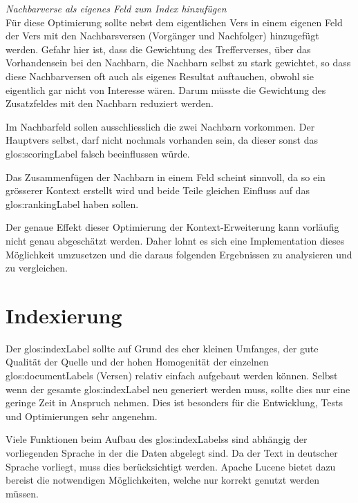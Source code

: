 \vspace{0.5em}
\textit{Nachbarverse als eigenes Feld zum Index hinzufügen}
\vspace{0.5em}\\
Für diese Optimierung sollte nebst dem eigentlichen Vers in einem eigenen Feld der Vers mit den Nachbarsversen (Vorgänger und Nachfolger) hinzugefügt werden.
Gefahr hier ist, dass die Gewichtung des Trefferverses, über das Vorhandensein bei den Nachbarn, die Nachbarn selbst zu stark gewichtet, so dass diese Nachbarversen oft auch als eigenes Resultat auftauchen, obwohl sie eigentlich gar nicht von Interesse wären. Darum müsste die Gewichtung des Zusatzfeldes mit den Nachbarn reduziert werden.

Im Nachbarfeld sollen ausschliesslich die zwei Nachbarn vorkommen. Der Hauptvers selbst, darf nicht nochmals vorhanden sein, da dieser sonst das \gls{glos:scoringLabel} falsch beeinflussen würde.

Das Zusammenfügen der Nachbarn in einem Feld scheint sinnvoll, da so ein grösserer Kontext erstellt wird und beide Teile gleichen Einfluss auf das \gls{glos:rankingLabel} haben sollen.

Der genaue Effekt dieser Optimierung der Kontext-Erweiterung kann vorläufig nicht genau abgeschätzt werden.
Daher lohnt es sich eine Implementation dieses Möglichkeit umzusetzen und die daraus folgenden Ergebnissen zu analysieren und zu vergleichen.


\section{Indexierung}
\label{sec:indexing}
Der \gls{glos:indexLabel} sollte auf Grund des eher kleinen Umfanges, der gute Qualität der Quelle und der hohen Homogenität der einzelnen \glspl{glos:documentLabel} (Versen) relativ einfach aufgebaut werden können.
Selbst wenn der gesamte \gls{glos:indexLabel} neu generiert werden muss, sollte dies nur eine geringe Zeit in Anspruch nehmen.
Dies ist besonders für die Entwicklung, Tests und Optimierungen sehr angenehm.

Viele Funktionen beim Aufbau des \glspl{glos:indexLabel}s sind abhängig der vorliegenden Sprache in der die Daten abgelegt sind.
Da der Text in deutscher Sprache vorliegt, muss dies berücksichtigt werden.
Apache Lucene bietet dazu bereist die notwendigen Möglichkeiten, welche nur korrekt genutzt werden müssen.

